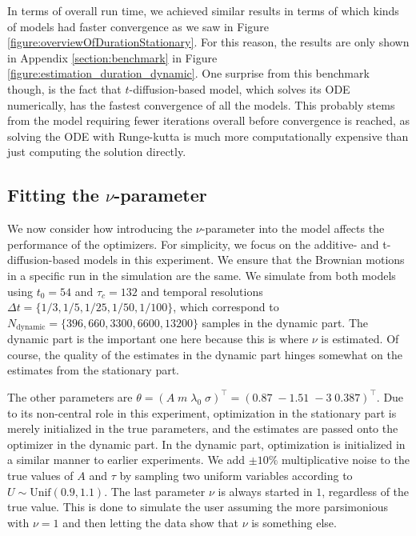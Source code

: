 In terms of overall run time, we achieved similar results in terms of which kinds of models had faster convergence as we saw in Figure \ref{figure:overviewOfDurationStationary}. For this reason, the results are only shown in Appendix \ref{section:benchmark} in Figure \ref{figure:estimation_duration_dynamic}. One surprise from this benchmark though, is the fact that $t$-diffusion-based model, which solves its ODE numerically, has the fastest convergence of all the models. This probably stems from the model requiring fewer iterations overall before convergence is reached, as solving the ODE with Runge-kutta is much more computationally expensive than just computing the solution directly.
\subsection{Fitting the \texorpdfstring{$\nu$}{nu}-parameter}
We now consider how introducing the $\nu$-parameter into the model affects the performance of the optimizers. For simplicity, we focus on the additive- and t-diffusion-based models in this experiment. We ensure that the Brownian motions in a specific run in the simulation are the same. We simulate from both models using $t_0 = 54$ and $\tau_c = 132$ and temporal resolutions $\Delta t = \{1/3, 1/5, 1/25, 1/50, 1/100\}$, which correspond to $N_\mathrm{dynamic} = \{396, 660, 3300, 6600, 13200\}$ samples in the dynamic part. The dynamic part is the important one here because this is where $\nu$ is estimated. Of course, the quality of the estimates in the dynamic part hinges somewhat on the estimates from the stationary part.

The other parameters are $\theta = (A\; m\; \lambda_0\; \sigma)^\top = (0.87\; -1.51\; -3\;  0.387)^\top$. Due to its non-central role in this experiment, optimization in the stationary part is merely initialized in the true parameters, and the estimates are passed onto the optimizer in the dynamic part. In the dynamic part, optimization is initialized in a similar manner to earlier experiments. We add $\pm 10\%$ multiplicative noise to the true values of $A$ and $\tau$ by sampling two uniform variables according to $U\sim \mathrm{Unif}(0.9,1.1)$. The last parameter $\nu$ is always started in $1$, regardless of the true value. This is done to simulate the user assuming the more parsimonious with $\nu = 1$ and then letting the data show that $\nu$ is something else. 

